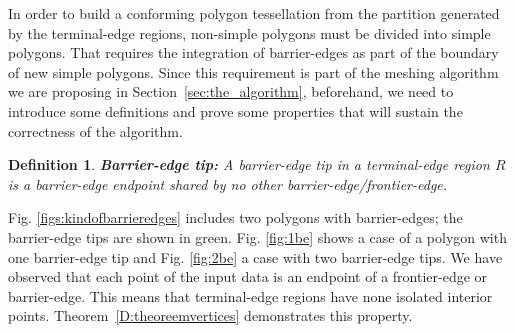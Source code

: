 \documentclass[lineno,pdflatex,sn-mathphys]{sn-jnl}%
\theoremstyle{thmstyleone}%
\theoremstyle{thmstyletwo}%
\theoremstyle{thmstylethree}%
\newtheorem{definition}{Definition}%
\begin{document}
  

In order to build a conforming polygon tessellation from the partition generated by the terminal-edge regions, non-simple polygons must be divided into simple polygons. That requires the integration of barrier-edges as part of the boundary of new simple polygons.  Since this requirement is part of the meshing algorithm we are proposing in Section~\ref{sec:the_algorithm},  beforehand, we need to introduce some definitions and prove some properties that will sustain the correctness of the algorithm.


\begin{definition}{\textbf{Barrier-edge tip:}}
\label{d:barrier-edge}
A barrier-edge tip in a terminal-edge region $R$ is a barrier-edge endpoint shared by no other barrier-edge/frontier-edge.
\end{definition}

 
Fig. \ref{figs:kindofbarrieredges} includes  two polygons with barrier-edges; the barrier-edge tips are shown in  green. Fig. \ref{fig:1be} shows a case of a polygon with one barrier-edge tip and Fig. \ref{fig:2be} a case with two barrier-edge tips.
We have observed that each point of the input data is an endpoint of a frontier-edge or barrier-edge. This means that terminal-edge regions have none isolated interior points.
Theorem~\ref{D:theoreemvertices} demonstrates this property.
\end{document}
